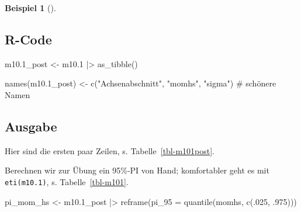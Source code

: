 \documentclass[
  ngerman,
  letterpaper,
  twoside,
  open=any]{scrbook}
\newenvironment{Shaded}{\begin{snugshade}}{\end{snugshade}}
\newcommand{\AttributeTok}[1]{\textcolor[rgb]{0.40,0.45,0.13}{#1}}
\newcommand{\CommentTok}[1]{\textcolor[rgb]{0.37,0.37,0.37}{#1}}
\newcommand{\DecValTok}[1]{\textcolor[rgb]{0.68,0.00,0.00}{#1}}
\newcommand{\FloatTok}[1]{\textcolor[rgb]{0.68,0.00,0.00}{#1}}
\newcommand{\FunctionTok}[1]{\textcolor[rgb]{0.28,0.35,0.67}{#1}}
\newcommand{\NormalTok}[1]{\textcolor[rgb]{0.00,0.23,0.31}{#1}}
\newcommand{\OtherTok}[1]{\textcolor[rgb]{0.00,0.23,0.31}{#1}}
\newcommand{\SpecialCharTok}[1]{\textcolor[rgb]{0.37,0.37,0.37}{#1}}
\newcommand{\StringTok}[1]{\textcolor[rgb]{0.13,0.47,0.30}{#1}}
\theoremstyle{definition}
\newtheorem{example}{Beispiel}[chapter]
\theoremstyle{plain}
\theoremstyle{definition}
\theoremstyle{definition}
\theoremstyle{remark}
\begin{document}
\begin{example}[]
\subsection{R-Code}

\begin{Shaded}
\begin{Highlighting}[]
\NormalTok{m10}\FloatTok{.1}\NormalTok{\_post }\OtherTok{\textless{}{-}}
\NormalTok{  m10}\FloatTok{.1} \SpecialCharTok{|\textgreater{}} 
  \FunctionTok{as\_tibble}\NormalTok{() }

\FunctionTok{names}\NormalTok{(m10}\FloatTok{.1}\NormalTok{\_post) }\OtherTok{\textless{}{-}} \FunctionTok{c}\NormalTok{(}\StringTok{"Achsenabschnitt"}\NormalTok{, }\StringTok{"momhs"}\NormalTok{, }\StringTok{"sigma"}\NormalTok{)  }\CommentTok{\# schönere Namen}
\end{Highlighting}
\end{Shaded}

\subsection{Ausgabe}

Hier sind die ersten paar Zeilen, s. Tabelle~\ref{tbl-m101post}.

\begin{table}

\caption{\label{tbl-m101post}m10.1, Stichprobe aus der Post-Verteilung,
ersten paar Zeilen}


\end{table}%

Berechnen wir zur Übung ein 95\%-PI von Hand; komfortabler geht es mit
\texttt{eti(m10.1)}, s. Tabelle~\ref{tbl-m101}.

\begin{Shaded}
\begin{Highlighting}[]
\NormalTok{pi\_mom\_hs }\OtherTok{\textless{}{-}}
\NormalTok{  m10}\FloatTok{.1}\NormalTok{\_post }\SpecialCharTok{|\textgreater{}}
  \FunctionTok{reframe}\NormalTok{(}\AttributeTok{pi\_95 =} \FunctionTok{quantile}\NormalTok{(momhs, }\FunctionTok{c}\NormalTok{(.}\DecValTok{025}\NormalTok{, .}\DecValTok{975}\NormalTok{)))}


\end{Highlighting}
\end{Shaded}
\end{example}
\end{document}
